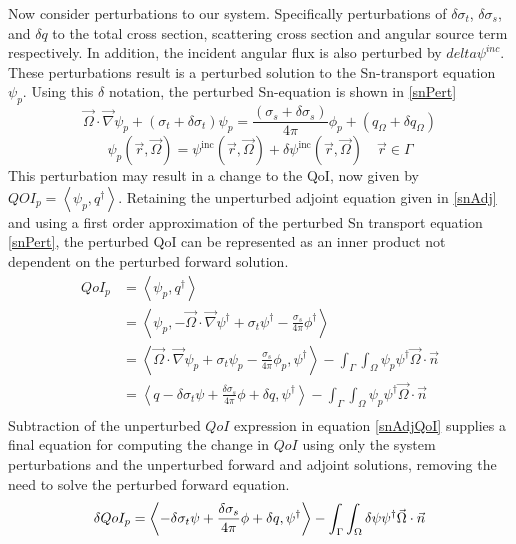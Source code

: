 \documentclass{article}
\newcommand{\vr}{\vec{r}}
\newcommand{\vO}{\vec{\Omega}}
\newcommand{\bra}{\left\langle}
\newcommand{\ket}{\right\rangle}
\newcommand{\vgrad}{\vec{\nabla}}
\newcommand{\sigt}{\sigma_t}
\newcommand{\sigs}{\sigma_s}
\newcommand{\angSource}{q_\Omega}
\newcommand{\scalSource}{q}
\newcommand{\angResp}{q^\dag}
\begin{document}
Now consider perturbations to our system. Specifically perturbations of $\delta \sigt$, $\delta \sigs$, and $\delta q$ to the total cross section, scattering cross section and angular source term respectively. In addition, the incident angular flux is also perturbed by $delta \psi^{inc}$. These perturbations result is a perturbed solution to the Sn-transport equation $\psi_p$. Using this $\delta$ notation, the perturbed Sn-equation is shown in \ref{snPert}
\begin{equation}
\label{snPert}
\vO \cdot \vgrad \psi_p + \left( \sigt + \delta \sigt \right) \psi_p = \frac{\left( \sigs + \delta \sigs \right)}{4 \pi} \phi_p + \left( \angSource + \delta \angSource \right)
\end{equation}
\begin{equation}
\psi_p(\vr,\vO) = \psi^{\text{inc}}(\vr,\vO) + \delta \psi^{\text{inc}}(\vr,\vO)\quad \vr \in \Gamma
\end{equation}
This perturbation may result in a change to the QoI, now given by $QOI_p=\bra \psi_p , \angResp \ket$. Retaining the unperturbed adjoint equation given in \ref{snAdj} and using a first order approximation of the perturbed Sn transport equation \ref{snPert}, the perturbed QoI can be represented as an inner product not dependent on the perturbed forward solution.
\begin{equation}
\label{snSens}
\begin{split}
QoI_p &=\bra \psi_p , \angResp \ket \\
&=\bra \psi_p , - \vO \cdot \vgrad \psi^\dag + \sigt \psi^\dag - \frac{\sigs}{4 \pi} \phi^\dag  \ket \\
&= \bra  \vO \cdot \vgrad \psi_p + \sigt \psi_p - \frac{\sigs}{4 \pi} \phi_p , \psi^\dag  \ket - \int_{\Gamma} \int_{\Omega} \psi_p \psi^\dag \vO \cdot \vec{n}\\
&= \bra  \scalSource - \delta \sigt \psi + \frac{\delta\sigs}{4 \pi} \phi + \delta \scalSource , \psi^\dag  \ket - \int_{\Gamma} \int_{\Omega} \psi_p \psi^\dag \vO \cdot \vec{n}\\
\end{split}
\end{equation}
Subtraction of the unperturbed $QoI$ expression in equation \ref{snAdjQoI} supplies a final equation for computing the change in $QoI$ using only the system perturbations and the unperturbed forward and adjoint solutions, removing the need to solve the perturbed forward equation.
\begin{equation}
\delta QoI_p = \bra - \delta \sigt \psi + \frac{\delta\sigs}{4 \pi} \phi + \delta \scalSource , \psi^\dag  \ket - \int_{\Gamma} \int_{\Omega} \delta \psi \psi^\dag \vO \cdot \vec{n}\\
\end{equation}
\end{document}

